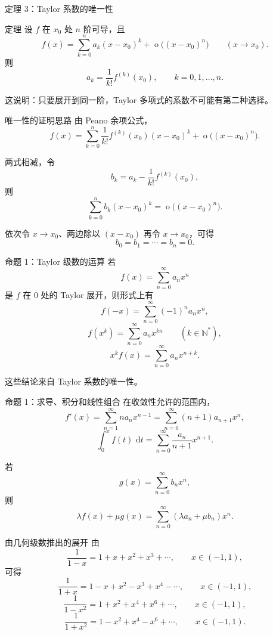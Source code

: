 \documentclass[aspectratio=169,11pt]{ctexbeamer}
\newcommand{\dd}{\,\mathrm{d}}
\newcommand{\ord}{\operatorname{o}}
\begin{document}
\begin{frame}{定理 3：Taylor 系数的唯一性}
\small
\begin{block}{定理}
设 $f$ 在 $x_0$ 处 $n$ 阶可导，且
\[
  f(x)=\sum_{k=0}^n a_k(x-x_0)^k
  +\ord\bigl((x-x_0)^n\bigr)\qquad (x\to x_0).
\]
则
\[
  a_k=\frac1{k!}f^{(k)}(x_0),
  \qquad k=0,1,\ldots,n.
\]
\end{block}

这说明：只要展开到同一阶，Taylor 多项式的系数不可能有第二种选择。
\end{frame}

\begin{frame}{唯一性的证明思路}
\small
由 Peano 余项公式，
\[
  f(x)=\sum_{k=0}^n
  \frac1{k!}f^{(k)}(x_0)(x-x_0)^k
  +\ord\bigl((x-x_0)^n\bigr).
\]

两式相减，令
\[
  b_k=a_k-\frac1{k!}f^{(k)}(x_0),
\]
则
\[
  \sum_{k=0}^n b_k(x-x_0)^k
  =
  \ord\bigl((x-x_0)^n\bigr).
\]

依次令 $x\to x_0$、两边除以 $(x-x_0)$ 再令 $x\to x_0$，可得
\[
  b_0=b_1=\cdots=b_n=0.
\]
\end{frame}

\begin{frame}{命题 1：Taylor 级数的运算}
\footnotesize
若
\[
  f(x)=\sum_{n=0}^{\infty}a_nx^n
\]
是 $f$ 在 $0$ 处的 Taylor 展开，则形式上有
\[
  f(-x)=\sum_{n=0}^{\infty}(-1)^n a_nx^n,
\]
\[
  f(x^k)=\sum_{n=0}^{\infty}a_nx^{kn}\qquad (k\in\mathbb{N}^*),
\]
\[
  x^k f(x)=\sum_{n=0}^{\infty}a_nx^{n+k}.
\]

这些结论来自 Taylor 系数的唯一性。
\end{frame}

\begin{frame}{命题 1：求导、积分和线性组合}
\footnotesize
在收敛性允许的范围内，
\[
  f'(x)=\sum_{n=1}^{\infty}na_nx^{n-1}
  =
  \sum_{n=0}^{\infty}(n+1)a_{n+1}x^n,
\]
\[
  \int_0^x f(t)\,\dd t
  =
  \sum_{n=0}^{\infty}\frac{a_n}{n+1}x^{n+1}.
\]

若
\[
  g(x)=\sum_{n=0}^{\infty}b_nx^n,
\]
则
\[
  \lambda f(x)+\mu g(x)
  =
  \sum_{n=0}^{\infty}(\lambda a_n+\mu b_n)x^n.
\]
\end{frame}

\begin{frame}{由几何级数推出的展开}
\small
由
\[
  \frac1{1-x}=1+x+x^2+x^3+\cdots,\qquad x\in(-1,1),
\]
可得
\[
  \frac1{1+x}=1-x+x^2-x^3+x^4-\cdots,\qquad x\in(-1,1),
\]
\[
  \frac1{1-x^2}=1+x^2+x^4+x^6+\cdots,\qquad x\in(-1,1),
\]
\[
  \frac1{1+x^2}=1-x^2+x^4-x^6+\cdots,\qquad x\in(-1,1).
\]
\end{frame}
\end{document}
